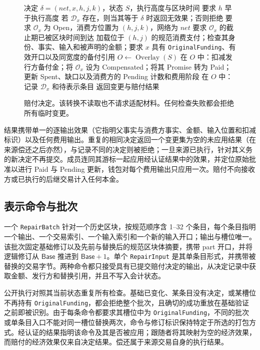 \begin{figure}[t]
  \small
  \begin{algorithmic}[1]
    \REQUIRE 决定 $\delta=(\mathit{net},x,h,j,k)$，状态 $S$，执行高度与区块时间
    \STATE 要求 $h$ 早于执行高度
    \STATE 若 $\mathcal D_x$ 存在，则当其等于 $\delta$ 时返回无效果；否则拒绝
    \STATE 要求 $\mathcal O_x$ 为 Open，消费方位置为 $(h,j,k)$，网络为 $\mathit{net}$
    \STATE 要求 $\mathcal O_x$ 的截止期已被区块时间到达
    \STATE 加载位于 $(h,j)$ 的规范消费支付；检查其身份、事实、输入和被声明的金额；要求 $x$ 具有 \texttt{OriginalFunding}、有效开口以及同宽度的备付引用
    \STATE $O\gets\operatorname{Overlay}(S)$
    \STATE 在 $O$ 中：扣减发行方备付金；将 $\mathcal O_x$ 设为 Compensated；将其 Promise 转为 Paid；更新 Spent、缺口以及消费方的 Pending 计数和费用阶段
    \STATE 在 $O$ 中：记录 $\mathcal D_x$ 和待表示条目
    \STATE 返回变更与赔付结果
  \end{algorithmic}
  \caption{赔付决定。该转换不读取也不请求适配材料。任何检查失败都会拒绝所有临时变更。}
  \label{fig:protocol-decision}
\end{figure}

结果携带单一的逐输出效果（它指明父事实与消费方事实、金额、输入位置和扣减标识）以及任何费用输出。重复的相同决定返回一个变更集为空的未应用结果（在来源偿还之后亦然），与记录不同的决定则被拒绝；一旦来源已执行，针对其义务的新决定不再提交。成员连同其游标一起应用经认证结果中的效果，并定位原始批准以进行 Paid 与 Pending 更新，钱包对每个费用输出只应用一次。赔付不向接收方或已执行的后继交易计入任何本金。

\subsection{表示命令与批次}
\label{sec:protocol-batch}

一个 \texttt{RepairBatch} 针对一个历史区块，按规范顺序含 1--32 个条目，每个条目指明一个输出、一个交易索引、一个输入索引和一个新的输入开口；输出与槽位唯一。该批次固定基础修订以及先前与替换后的规范区块体摘要，携带 part 开口，并将逻辑修订从 $\mathsf{Base}$ 推进到 $\mathsf{Base}+1$。单个 \texttt{RepairInput} 是其单条目形式，并携带被替换的交易字节。两种命令都只接受具有已提交赔付决定的输出，从决定记录中获取金额、发行方和替换引用，并且不写入会计状态。

公开执行对照其当前状态重复所有检查。基础已变化、某条目没有决定，或某槽位不再持有 \texttt{OriginalFunding}，都会拒绝整个批次，且确切的成功重放在基础验证之前即被识别。由于每条命令都要求其槽位中为 \texttt{OriginalFunding}，不同的批次或单条目入口不能对同一槽位替换两次，命令与修订标识保持特定于所选的打包方式。经认证的结果指明该命令及其是否被应用；跟随者将其映射为空的经济效果，而赔付的经济效果仅来自决定结果。偿还属于来源交易自身的执行结果。

